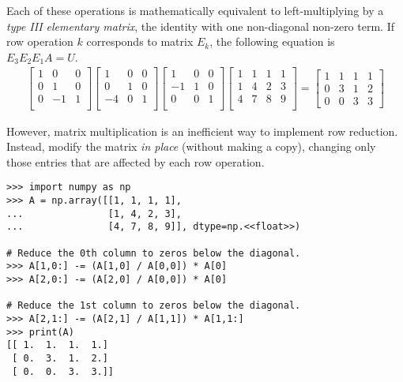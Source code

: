 Each of these operations is mathematically equivalent to left-multiplying by a \emph{type III elementary matrix}, the identity with one non-diagonal non-zero term.
If row operation $k$ corresponds to matrix $E_k$, the following equation is $E_3E_2E_1A = U$.
%
\begin{align*}
\left[\begin{array}{ccc}
1 & 0 & 0 \\
0 & 1 & 0 \\
0 & -1 & 1 \\
\end{array}\right]
\left[\begin{array}{ccc}
1 & 0 & 0 \\
0 & 1 & 0 \\
-4 & 0 & 1 \\
\end{array}\right]
\left[\begin{array}{ccc}
1 & 0 & 0 \\
-1 & 1 & 0 \\
0 & 0 & 1 \\
\end{array}\right]
\left[\begin{array}{ccc|c}
1 & 1 & 1 & 1 \\
1 & 4 & 2 & 3 \\
4 & 7 & 8 & 9 \\
\end{array}\right]
=
\left[\begin{array}{ccc|c}
1 & 1 & 1 & 1 \\
0 & 3 & 1 & 2 \\
0 & 0 & 3 & 3
\end{array}\right]
\end{align*}

However, matrix multiplication is an inefficient way to implement row reduction.
Instead, modify the matrix \emph{in place} (without making a copy), changing only those entries that are affected by each row operation.

\begin{lstlisting}
>>> import numpy as np
>>> A = np.array([[1, 1, 1, 1],
...               [1, 4, 2, 3],
...               [4, 7, 8, 9]], dtype=np.<<float>>)

# Reduce the 0th column to zeros below the diagonal.
>>> A[1,0:] -= (A[1,0] / A[0,0]) * A[0]
>>> A[2,0:] -= (A[2,0] / A[0,0]) * A[0]

# Reduce the 1st column to zeros below the diagonal.
>>> A[2,1:] -= (A[2,1] / A[1,1]) * A[1,1:]
>>> print(A)
[[ 1.  1.  1.  1.]
 [ 0.  3.  1.  2.]
 [ 0.  0.  3.  3.]]
\end{lstlisting}

